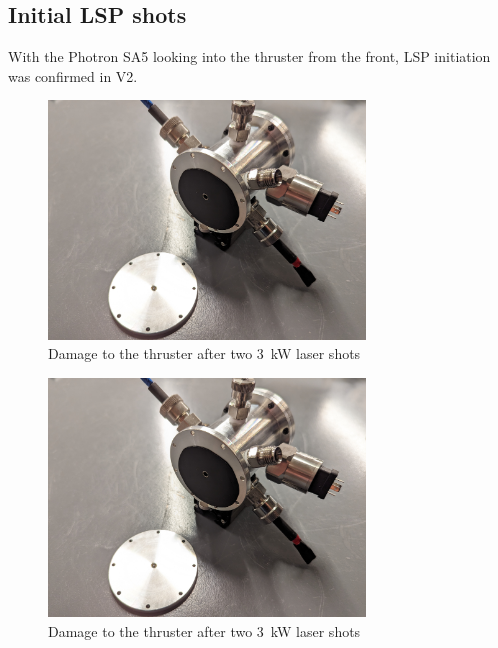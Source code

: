         \subsection{Initial LSP shots}

            With the Photron SA5 looking into the thruster from the front, LSP initiation was confirmed in V2.

            \begin{figure}[!ht]
                \centering
                \includegraphics[width=0.75\textwidth]{assets/4 experiments/V2 test damage.jpg}
                \caption{Damage to the thruster after two \qty{3}{kW} laser shots}
            \end{figure}

            \begin{figure}[!ht]
                \centering
                \includegraphics[width=0.75\textwidth]{assets/4 experiments/V2 test damage.jpg}
                \caption{Damage to the thruster after two \qty{3}{kW} laser shots}
            \end{figure}

